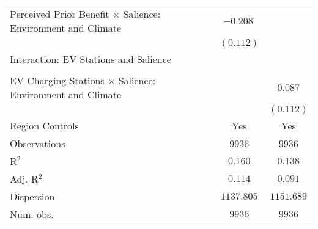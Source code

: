 \begin{center}
\begin{tiny}
\begin{longtable}{l@{} c@{} c@{}}
\quad Perceived Prior Benefit $\times$ Salience: Environment and Climate & $-0.208^{\cdot}$ &                \\
                                                                         & $(0.112)$        &                \\
Interaction: EV Stations and Salience                                    &                  &                \\
                                                                         &                  &                \\
\quad EV Charging Stations $\times$ Salience: Environment and Climate    &                  & $0.087$        \\
                                                                         &                  & $(0.112)$      \\
\hline
Region Controls                                                          & Yes              & Yes            \\
Observations                                                             & 9936             & 9936           \\
R$^2$                                                                    & $0.160$          & $0.138$        \\
Adj. R$^2$                                                               & $0.114$          & $0.091$        \\
Dispersion                                                               & $1137.805$       & $1151.689$     \\
Num. obs.                                                                & $9936$           & $9936$         \\
\end{longtable}
\end{tiny}
\end{center}
